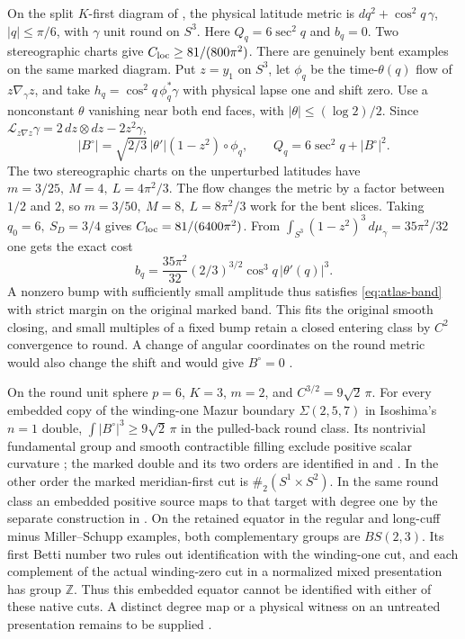 \documentclass[11pt,letterpaper]{article}
\numberwithin{equation}{section}
\theoremstyle{definition}
\begin{document}
On the split \(K\)-first diagram of \cite{Baker2026HandleCuts},
the physical latitude metric is \(dq^2+\cos^2 q\,\gamma\),
\(|q|\le\pi/6\), with \(\gamma\) unit round on \(S^3\).
Here \(Q_q=6\sec^2q\) and \(b_q=0\). Two stereographic charts
give \(C_{\rm loc}\ge81/(800\pi^2)\).
There are genuinely bent examples on the same marked diagram. Put
\(z=y_1\) on \(S^3\), let \(\phi_q\) be the time-\(\theta(q)\) flow of
\(z\nabla_\gamma z\), and take
\(h_q=\cos^2 q\,\phi_q^*\gamma\) with physical lapse one and shift zero.
Use a nonconstant \(\theta\) vanishing near both end faces, with
\(|\theta|\le(\log2)/2\). Since
\(\mathcal L_{z\nabla z}\gamma=2\,dz\otimes dz-2z^2\gamma\),
\[
 |B^\circ|=\sqrt{2/3}\,|\theta'|(1-z^2)\circ\phi_q,\qquad
 Q_q=6\sec^2 q+|B^\circ|^2 .
\]
The two stereographic charts on the unperturbed latitudes have
\(m=3/25,\ M=4,\ L=4\pi^2/3\). The flow changes the metric by a
factor between \(1/2\) and \(2\), so \(m=3/50,\ M=8,\ L=8\pi^2/3\)
work for the bent slices. Taking \(q_0=6,\ S_D=3/4\) gives
\(C_{\rm loc}=81/(6400\pi^2)\). From
\(\int_{S^3}(1-z^2)^3\,d\mu_\gamma=35\pi^2/32\) one gets the exact cost
\[
 b_q=\frac{35\pi^2}{32}(2/3)^{3/2}\cos^3 q\,|\theta'(q)|^3.
\]
A nonzero bump with sufficiently small amplitude thus satisfies
\eqref{eq:atlas-band} with strict margin on the original marked band.
This fits the original smooth closing, and small multiples of a fixed
bump retain a closed entering class by \(C^2\) convergence to round.
A change of angular coordinates on the round metric would also change
the shift and would give \(B^\circ=0\)
\cite[finite-atlas estimate and split calibrations]{Baker2026MarkedCutCalculations}.

On the round unit sphere \(p=6\), \(K=3\), \(m=2\), and
\(C^{3/2}=9\sqrt2\,\pi\). For every embedded copy of the winding-one
Mazur boundary \(\Sigma(2,5,7)\) in Isoshima's \(n=1\) double,
\(\int|B^\circ|^3\ge9\sqrt2\,\pi\) in the pulled-back round class.
Its nontrivial fundamental group and smooth contractible filling exclude
positive scalar curvature \cite[Corollary 2.3 and Proposition 4.2]{ChodoshMaximoMukherjee2024Complete};
the marked double and its two orders are identified in
\cite[Figure 37]{Isoshima2025MazurDoubles} and \cite{Baker2026HandleCuts}. In the other order the marked
meridian-first cut is \(\#_2(S^1\times S^2)\). In the same round class
an embedded positive source maps to that target with degree one by the
separate construction in \cite{Baker2026ChiralMaster}.
On the retained equator in the regular and long-cuff minus
Miller--Schupp examples, both complementary groups are \(BS(2,3)\).
Its first Betti number two rules out identification with the winding-one
cut, and each complement of the actual winding-zero cut in a normalized
mixed presentation has group \(\mathbb Z\). Thus this embedded equator
cannot be identified with either of these native cuts. A distinct degree
map or a physical witness on an untreated presentation remains to be
supplied \cite{Baker2026ChiralMaster}.
\end{document}
